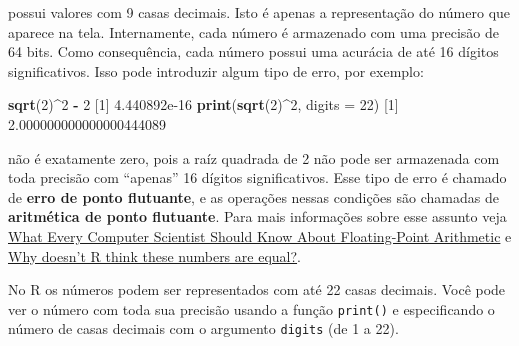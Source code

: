 \documentclass[10pt,a4paper]{book}
\newenvironment{Shaded}{\begin{snugshade}}{\end{snugshade}}
\newcommand{\KeywordTok}[1]{\textcolor[rgb]{0.13,0.29,0.53}{\textbf{#1}}}
\newcommand{\DataTypeTok}[1]{\textcolor[rgb]{0.13,0.29,0.53}{#1}}
\newcommand{\DecValTok}[1]{\textcolor[rgb]{0.00,0.00,0.81}{#1}}
\newcommand{\FloatTok}[1]{\textcolor[rgb]{0.00,0.00,0.81}{#1}}
\newcommand{\StringTok}[1]{\textcolor[rgb]{0.31,0.60,0.02}{#1}}
\newcommand{\OperatorTok}[1]{\textcolor[rgb]{0.81,0.36,0.00}{\textbf{#1}}}
\newcommand{\NormalTok}[1]{#1}
\begin{document}
possui valores com 9 casas decimais. Isto é apenas a representação do
número que aparece na tela. Internamente, cada número é armazenado com
uma precisão de 64 bits. Como consequência, cada número possui uma
acurácia de até 16 dígitos significativos. Isso pode introduzir algum
tipo de erro, por exemplo:

\begin{Shaded}
\begin{Highlighting}[]
\KeywordTok{sqrt}\NormalTok{(}\DecValTok{2}\NormalTok{)}\OperatorTok{^}\DecValTok{2} \OperatorTok{-}\StringTok{ }\DecValTok{2}
\NormalTok{[}\DecValTok{1}\NormalTok{] }\FloatTok{4.440892e-16}
\KeywordTok{print}\NormalTok{(}\KeywordTok{sqrt}\NormalTok{(}\DecValTok{2}\NormalTok{)}\OperatorTok{^}\DecValTok{2}\NormalTok{, }\DataTypeTok{digits =} \DecValTok{22}\NormalTok{)}
\NormalTok{[}\DecValTok{1}\NormalTok{] }\FloatTok{2.000000000000000444089}
\end{Highlighting}
\end{Shaded}

não é exatamente zero, pois a raíz quadrada de 2 não pode ser armazenada
com toda precisão com ``apenas'' 16 dígitos significativos. Esse tipo de
erro é chamado de \textbf{erro de ponto flutuante}, e as operações
nessas condições são chamadas de \textbf{aritmética de ponto flutuante}.
Para mais informações sobre esse assunto veja
\href{http://www.validlab.com/goldberg/paper.pdf}{What Every Computer
Scientist Should Know About Floating-Point Arithmetic} e
\href{http://cran-r.c3sl.ufpr.br/doc/FAQ/R-FAQ.html\#Why-doesn_0027t-R-think-these-numbers-are-equal_003f}{Why
doesn't R think these numbers are equal?}.

No R os números podem ser representados com até 22 casas decimais. Você
pode ver o número com toda sua precisão usando a função \texttt{print()}
e especificando o número de casas decimais com o argumento
\texttt{digits} (de 1 a 22).
\end{document}
